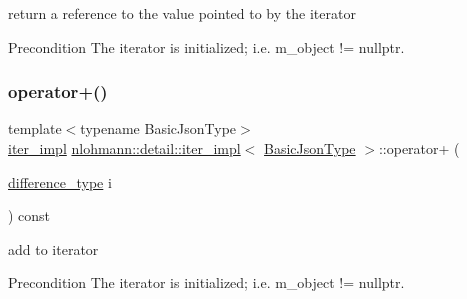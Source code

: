 return a reference to the value pointed to by the iterator 

\begin{DoxyPrecond}{Precondition}
The iterator is initialized; i.\+e. {\ttfamily m\+\_\+object != nullptr}. 
\end{DoxyPrecond}
\mbox{\label{classnlohmann_1_1detail_1_1iter__impl_a8ef76aeb5a5032768f0f61f48ac189c0}} 
\subsubsection{\texorpdfstring{operator+()}{operator+()}}
{\footnotesize\ttfamily template$<$typename Basic\+Json\+Type$>$ \\
\hyperlink{classnlohmann_1_1detail_1_1iter__impl}{iter\+\_\+impl} \hyperlink{classnlohmann_1_1detail_1_1iter__impl}{nlohmann\+::detail\+::iter\+\_\+impl}$<$ \hyperlink{classnlohmann_1_1detail_1_1iter__impl_abf18f18793f84b0222aebb5a2a87da7a}{Basic\+Json\+Type} $>$\+::operator+ (\begin{DoxyParamCaption}\item[{\hyperlink{classnlohmann_1_1detail_1_1iter__impl_a2f7ea9f7022850809c60fc3263775840}{difference\+\_\+type}}]{i }\end{DoxyParamCaption}) const\hspace{0.3cm}{\ttfamily [inline]}}



add to iterator 

\begin{DoxyPrecond}{Precondition}
The iterator is initialized; i.\+e. {\ttfamily m\+\_\+object != nullptr}. 
\end{DoxyPrecond}
\mbox{\label{classnlohmann_1_1detail_1_1iter__impl_a7d2397773b2dce42f30f0375a6a1d850}} 
